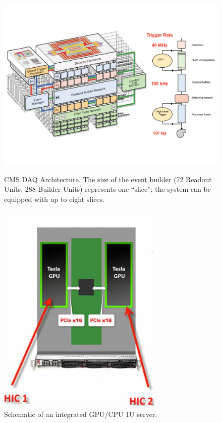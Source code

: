 \documentclass{JINST}
\begin{document}
\begin{figure}[!Hhtb]
\begin{minipage}[t]{8.0cm}
       \begin{center}
	\includegraphics[width=.9\textwidth]{figs/CMSTrigger.pdf}
	\caption{CMS DAQ Architecture. The size  of the event builder (72 Readout
Units, 288  Builder Units) represents one “slice”; the  system can be equipped
with up to eight slices. \label{fig:hltarc}}
	\end{center}
\end{minipage}
\begin{minipage}[t]{6.0cm}
\begin{center}
	\includegraphics[width=0.7\textwidth]{figs/integrated1U.pdf}
	\caption{Schematic of an integrated GPU/CPU 1U server.   \label{fig:integratedsys}}
	\end{center}
\end{minipage}
\end{figure}
\end{document}
